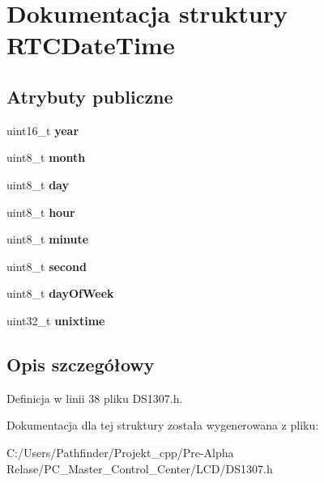 \hypertarget{struct_r_t_c_date_time}{}\section{Dokumentacja struktury R\+T\+C\+Date\+Time}
\label{struct_r_t_c_date_time}
\subsection*{Atrybuty publiczne}
\begin{DoxyCompactItemize}
\item 
\mbox{\label{struct_r_t_c_date_time_a265de5469447ed7581fec4d3c0c5814d}} 
uint16\+\_\+t {\bfseries year}
\item 
\mbox{\label{struct_r_t_c_date_time_a434dc70ef64a1e99201f3765607e8afa}} 
uint8\+\_\+t {\bfseries month}
\item 
\mbox{\label{struct_r_t_c_date_time_aea80bfd1209e6e459c70ea39bc248407}} 
uint8\+\_\+t {\bfseries day}
\item 
\mbox{\label{struct_r_t_c_date_time_aaf23cb6337a6c0cb3bb69ad815f9c1b1}} 
uint8\+\_\+t {\bfseries hour}
\item 
\mbox{\label{struct_r_t_c_date_time_a2e9c4e2b54185ec5bb7f328732bc1c63}} 
uint8\+\_\+t {\bfseries minute}
\item 
\mbox{\label{struct_r_t_c_date_time_acf01c0fbd1d95fe33238674641f40027}} 
uint8\+\_\+t {\bfseries second}
\item 
\mbox{\label{struct_r_t_c_date_time_a3fa952239e8a35b7ec390838ae1a6bd0}} 
uint8\+\_\+t {\bfseries day\+Of\+Week}
\item 
\mbox{\label{struct_r_t_c_date_time_af46df69448c5456b54e9acae7629efa8}} 
uint32\+\_\+t {\bfseries unixtime}
\end{DoxyCompactItemize}


\subsection{Opis szczegółowy}


Definicja w linii 38 pliku D\+S1307.\+h.



Dokumentacja dla tej struktury została wygenerowana z pliku\+:\begin{DoxyCompactItemize}
\item 
C\+:/\+Users/\+Pathfinder/\+Projekt\+\_\+cpp/\+Pre-\/\+Alpha Relase/\+P\+C\+\_\+\+Master\+\_\+\+Control\+\_\+\+Center/\+L\+C\+D/D\+S1307.\+h\end{DoxyCompactItemize}
